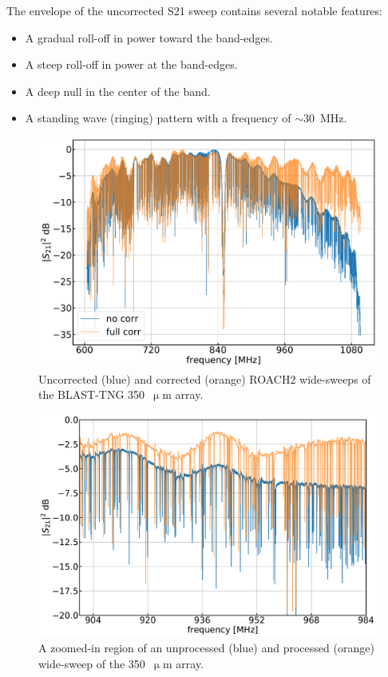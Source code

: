 The envelope of the uncorrected \gls{S21} sweep contains several notable features:

\begin{itemize}[nosep]
  \item A gradual roll-off in power toward the band-edges.
  \item A steep roll-off in power at the band-edges.
  \item A deep null in the center of the band.
  \item A standing wave (ringing) pattern with a frequency of $\sim$30~MHz.
\end{itemize}

\begin{figure}[!htbp]
\centering
\includegraphics[width=\textwidth]{figures/blast_data/sweeps/350_wide_sweep}
\caption[~Comparison between raw and corrected wide-sweeps of the  array.]{Uncorrected (blue) and corrected (orange) ROACH2 wide-sweeps of the BLAST-TNG 350~$\upmu$m array.}
\label{fig:350 wide sweep}
\end{figure}

\begin{figure}[!htbp]
\centering
\includegraphics[width=\textwidth]{figures/blast_data/sweeps/350_wide_sweep_zoom}
\caption[~A zoomed-in region of an unprocessed and processed wide-sweep of the  array.]{A zoomed-in region of an unprocessed (blue) and processed (orange) wide-sweep of the 350~$\upmu$m array.}
\label{fig:350 zoom}
\end{figure}

